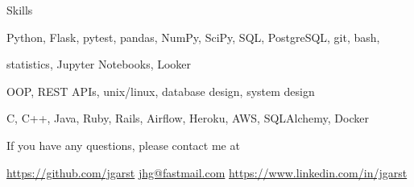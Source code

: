 \documentclass[11pt,a4paper]{article}
\begin{document}
\begin{mysection}{Skills}

    \begin{addmargin}[0.5em]{0em}
      \phantom{\large\bfseries Software Fundamentals: \quad}
      Python, Flask, pytest, pandas, NumPy, SciPy, SQL, PostgreSQL, git, bash,
    \end{addmargin}

    \begin{addmargin}[0.5em]{0em}
      \makebox[0pt][l]{}
      \phantom{\large\bfseries Software Fundamentals: \quad}
      statistics, Jupyter Notebooks, Looker
    \end{addmargin}

    \begin{addmargin}[0.5em]{0em}
      \phantom{\large\bfseries Software Fundamentals: \quad}
      OOP, REST APIs, unix/linux, database design, system design
    \end{addmargin}

    \begin{addmargin}[0.5em]{0em}

      \phantom{\large\bfseries Software Fundamentals: \quad}
      C, C++, Java, Ruby, Rails, Airflow, Heroku, AWS, SQLAlchemy, Docker
    \end{addmargin}

\end{mysection}

\vfill

\begin{center}
    If you have any questions, please contact me at
\end{center}

\begin{center}
    \href{https://github.com/jgarst}{https://github.com/jgarst} 
    \textbullet{} 
    \href{jhg@fastmail.com}{jhg@fastmail.com}
    \textbullet{} 
    \href{https://www.linkedin.com/in/jgarst}
        {https://www.linkedin.com/in/jgarst}
\end{center}
\end{document}
